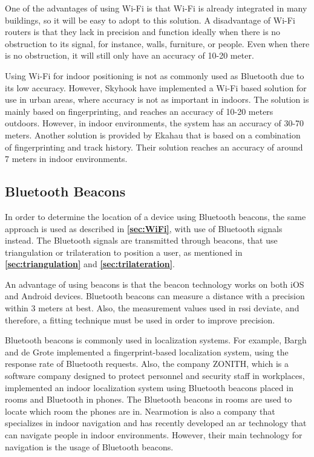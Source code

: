 One of the advantages of using Wi-Fi is that Wi-Fi is already integrated in many buildings, so it will be easy to adopt to this solution.
A disadvantage of Wi-Fi routers is that they lack in precision and function ideally when there is no obstruction to its signal, for instance, walls, furniture, or people. Even when there is no obstruction, it will still only have an accuracy of 10-20 meter.\cite{oriient}

Using Wi-Fi for indoor positioning is not as commonly used as Bluetooth due to its low accuracy. However, Skyhook have implemented a Wi-Fi based solution for use in urban areas, where accuracy is not as important in indoors. The solution is mainly based on fingerprinting, and reaches an accuracy of 10-20 meters outdoors. However, in indoor environments, the system has an accuracy of 30-70 meters. Another solution is provided by Ekahau that is based on a combination of fingerprinting and track history. Their solution reaches an accuracy of around 7 meters in indoor environments.\cite{HabilitationThesis}

\subsection{Bluetooth Beacons}
In order to determine the location of a device using Bluetooth beacons, the same approach is used as described in \textbf{\autoref{sec:WiFi}}, with use of Bluetooth signals instead. The Bluetooth signals are transmitted through beacons, that use triangulation or trilateration to position a user, as mentioned in \textbf{\autoref{sec:triangulation}} and \textbf{\autoref{sec:trilateration}}.


An advantage of using beacons is that the beacon technology works on both iOS and Android devices.
Bluetooth beacons can measure a distance with a precision within 3 meters at best.\cite{BluetoothBeacons} Also, the measurement values used in \gls{rssi} deviate, and therefore, a fitting technique must be used in order to improve precision\cite{RSSIWiFiDistance}.

Bluetooth beacons is commonly used in localization systems. For example, Bargh and de Grote implemented a fingerprint-based localization system, using the response rate of Bluetooth requests.\cite{HabilitationThesis} Also, the company ZONITH, which is a software company designed to protect personnel and security staff in workplaces\cite{zonith}, implemented an indoor localization system using Bluetooth beacons placed in rooms and Bluetooth in phones. The Bluetooth beacons in rooms are used to locate which room the phones are in.\cite{HabilitationThesis}
Nearmotion is also a company that specializes in indoor navigation and has recently developed an \gls{ar} technology that can navigate people in indoor environments. However, their main technology for navigation is the usage of Bluetooth beacons.\cite{nearmotion}

